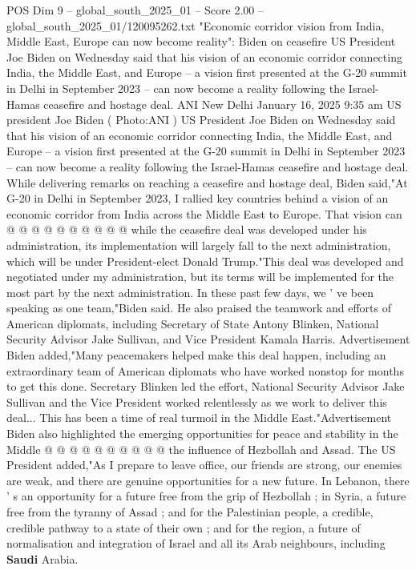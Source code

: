 \begin{textsample}{POS Dim 9 – global\_south\_2025\_01 – Score 2.00 – global\_south\_2025\_01/120095262.txt}  \label{ex:f9_pos_305}
"Economic corridor vision from India, Middle East, Europe can now become reality": Biden on ceasefire US President Joe Biden on Wednesday said that his vision of an economic corridor connecting India, the Middle East, and Europe -- a vision first presented at the G-20 summit in Delhi in September 2023 -- can now become a reality following the Israel-Hamas ceasefire and hostage deal.
ANI New Delhi January 16, 2025 9:35 am US president Joe Biden ( Photo:ANI ) US President Joe Biden on Wednesday said that his vision of an economic corridor connecting India, the Middle East, and Europe -- a vision first presented at the G-20 summit in Delhi in September 2023 -- can now become a reality following the Israel-Hamas ceasefire and hostage deal.
While delivering remarks on reaching a ceasefire and hostage deal, Biden said,"At G-20 in Delhi in September 2023, I rallied key countries behind a vision of an economic corridor from India across the Middle East to Europe.
That vision can @ @ @ @ @ @ @ @ @ @ while the ceasefire deal was developed under his administration, its implementation will largely fall to the next administration, which will be under President-elect Donald Trump."This deal was developed and negotiated under my administration, but its terms will be implemented for the most part by the next administration.
In these past few days, we ' ve been speaking as one team,"Biden said.
He also praised the teamwork and efforts of American diplomats, including Secretary of State Antony Blinken, National Security Advisor Jake Sullivan, and Vice President Kamala Harris.
Advertisement Biden added,"Many peacemakers helped make this deal happen, including an extraordinary team of American diplomats who have worked nonstop for months to get this done.
Secretary Blinken led the effort, National Security Advisor Jake Sullivan and the Vice President worked relentlessly as we work to deliver this deal...
This has been a time of real turmoil in the Middle East."Advertisement Biden also highlighted the emerging opportunities for peace and stability in the Middle @ @ @ @ @ @ @ @ @ @ the influence of Hezbollah and Assad.
The US President added,"As I prepare to leave office, our friends are strong, our enemies are weak, and there are genuine opportunities for a new future.
In Lebanon, there ' s an opportunity for a future free from the grip of Hezbollah ; in Syria, a future free from the tyranny of Assad ; and for the Palestinian people, a credible, credible pathway to a state of their own ; and for the region, a future of normalisation and integration of Israel and all its Arab neighbours, including \textbf{Saudi} Arabia.

\end{textsample}
